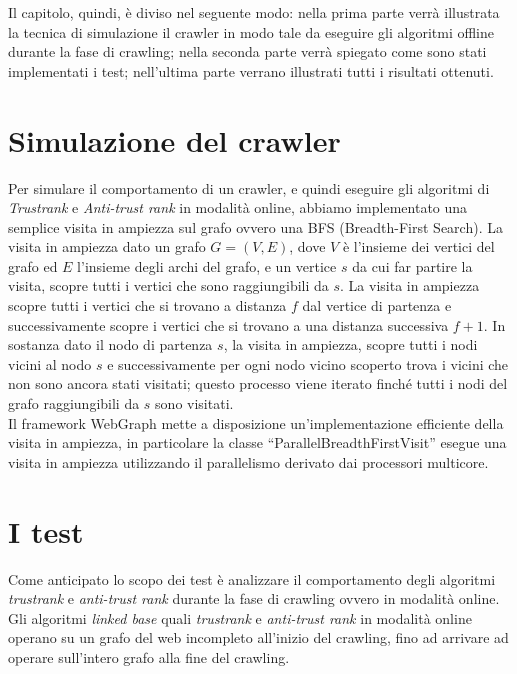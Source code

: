 Il capitolo, quindi, è diviso nel seguente modo: nella prima parte verrà illustrata la tecnica di simulazione il crawler in modo tale da eseguire gli algoritmi offline durante la fase di crawling; nella seconda parte verrà spiegato come sono stati implementati i test; nell'ultima parte verrano illustrati tutti i risultati ottenuti.

\section{Simulazione del crawler}
Per simulare il comportamento di un crawler, e quindi eseguire gli algoritmi di \textit{Trustrank} e \textit{Anti-trust rank} in modalità online, abbiamo implementato una semplice visita in ampiezza sul grafo ovvero una BFS \cite{bfsCormen} (Breadth-First Search). La visita in ampiezza dato un grafo \(G=(V,E)\), dove \(V\) è l'insieme dei vertici del grafo ed \(E\) l'insieme degli archi del grafo, e un vertice \(s\) da cui far partire la visita, scopre tutti i vertici che sono raggiungibili da \(s\). La visita in ampiezza scopre tutti i vertici che si trovano a distanza \(f\) dal vertice di partenza e successivamente scopre i vertici che si trovano a una distanza successiva \(f+1\). In sostanza dato il nodo di partenza \(s\), la visita in ampiezza, scopre tutti i nodi vicini al nodo \(s\) e successivamente per ogni nodo vicino scoperto trova i vicini che non sono ancora stati visitati; questo processo viene iterato finché tutti i nodi del grafo raggiungibili da \(s\) sono visitati. \\
Il framework WebGraph mette a disposizione un'implementazione efficiente della visita in ampiezza, in particolare  la classe ``ParallelBreadthFirstVisit'' esegue una visita in ampiezza utilizzando il parallelismo derivato dai processori multicore.

\section{I test}
Come anticipato lo scopo dei test è analizzare il comportamento degli algoritmi \textit{trustrank} e \textit{anti-trust rank} durante la fase di crawling ovvero in modalità online. Gli algoritmi \textit{linked base} quali \textit{trustrank} e \textit{anti-trust rank} in modalità online operano su un grafo del web incompleto all'inizio del crawling, fino ad arrivare ad operare sull'intero grafo alla fine del crawling.


